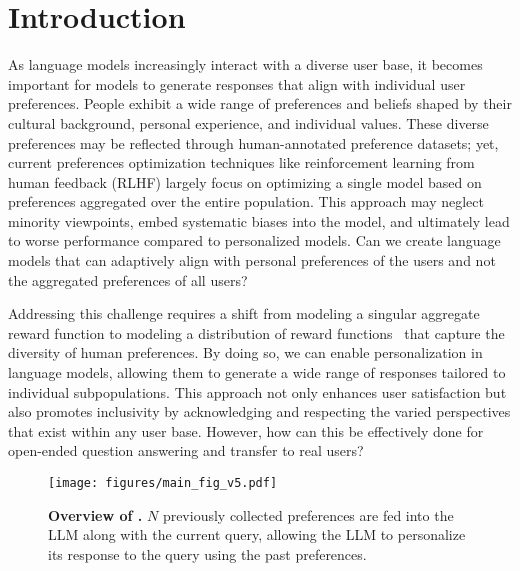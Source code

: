 \vspace{-0.15cm}
\section{Introduction}  \label{sec:intro}
\vspace{-0.15cm}

As language models increasingly interact with a diverse user base, it becomes important for models to generate responses that align with individual user preferences. People exhibit a wide range of preferences and beliefs shaped by their cultural background, personal experience, and individual values. These diverse preferences may be reflected through human-annotated preference datasets; yet, current preferences optimization techniques like reinforcement learning from human feedback (RLHF) largely focus on optimizing a single model based on preferences aggregated over the entire population. This approach may neglect minority viewpoints, embed systematic biases into the model, and ultimately lead to worse performance compared to personalized models. Can we create language models that can adaptively align with personal preferences of the users and not the aggregated preferences of all users? 

Addressing this challenge requires a shift from modeling a singular aggregate reward function to modeling a distribution of reward functions~\citep{sorensen2024roadmappluralisticalignment, jang2023personalizedsoupspersonalizedlarge} that capture the diversity of human preferences. By doing so, we can enable personalization in language models, allowing them to generate a wide range of responses tailored to individual subpopulations. This approach not only enhances user satisfaction but also promotes inclusivity by acknowledging and respecting the varied perspectives that exist within any user base. However, how can this be effectively done for open-ended question answering and transfer to real users?

\begin{figure*}
    \centering
    \texttt{[image: figures/main\_fig\_v5.pdf]}
    \caption{\footnotesize\textbf{ Overview of \methodname.} $N$ previously collected preferences are fed into the LLM along with the current query, allowing the LLM to personalize its response to the query using the past preferences.}
    \vspace{-0.3cm}
    \label{fig:fspo-overview}
\end{figure*}

